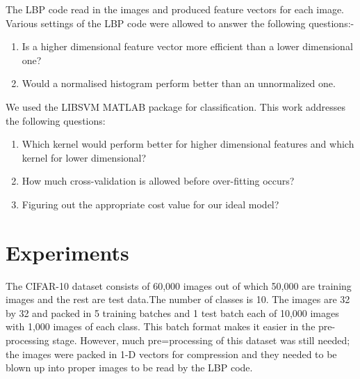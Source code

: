 \documentclass[preprint,12pt]{elsarticle}
\begin{document}
The LBP code read in the images and produced feature vectors for each image. Various settings of the LBP code were allowed to answer the following questions:-\\

\begin{enumerate}
\item Is a higher dimensional feature vector more efficient than a lower dimensional one?
\item Would a normalised histogram perform better than an unnormalized one.
\end{enumerate}

We used the LIBSVM MATLAB package for classification. This work addresses the following questions:\\

\begin{enumerate}
\item Which kernel would perform better for higher dimensional features and which kernel for lower dimensional?
\item How much cross-validation is allowed before over-fitting occurs?
\item Figuring out the appropriate cost value for our ideal model?
\end{enumerate}







\section{Experiments}
\label{S:2}


The CIFAR-10 dataset consists of 60,000 images out of which 50,000 are training images and the rest are test data.The number of classes is 10. The images are 32 by 32 and packed in 5 training batches and 1 test batch each of 10,000 images with 1,000 images of each class. This batch format makes it easier in the pre-processing stage. However, much pre=processing of this dataset was still needed; the images were packed in 1-D vectors for compression and they needed to be blown up into proper images to be read by the LBP code.\\
\end{document}
